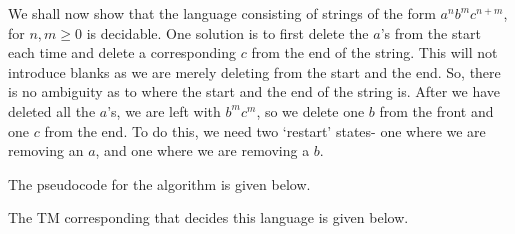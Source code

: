 \documentclass[a4paper, openany]{memoir}
\begin{document}
We shall now show that the language consisting of strings of the form $a^n b^m c^{n+m}$, for $n, m \geq 0$ is decidable. One solution is to first delete the $a$'s from the start each time and delete a corresponding $c$ from the end of the string. This will not introduce blanks as we are merely deleting from the start and the end. So, there is no ambiguity as to where the start and the end of the string is. After we have deleted all the $a$'s, we are left with $b^m c^m$, so we delete one $b$ from the front and one $c$ from the end. To do this, we need two `restart' states- one where we are removing an $a$, and one where we are removing a $b$.

The pseudocode for the algorithm is given below.


The TM corresponding that decides this language is given below.
\end{document}
